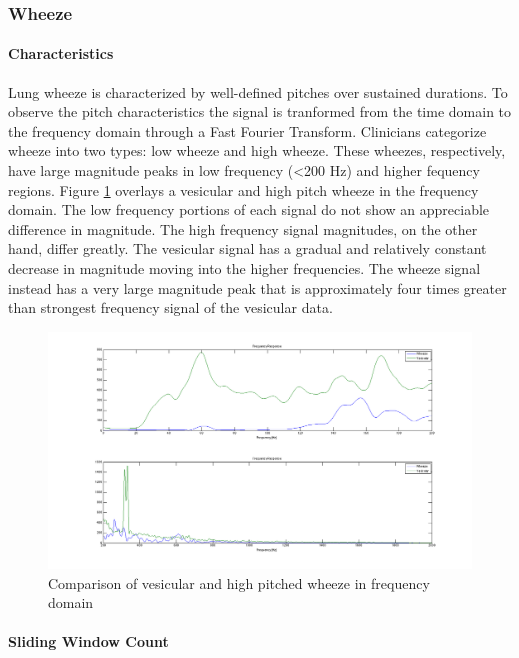 \documentclass{article}
\begin{document}
\subsubsection{Wheeze}

\paragraph{Characteristics}

Lung wheeze is characterized by well-defined pitches over sustained durations. To observe the pitch characteristics the signal is tranformed from the time domain to the frequency domain through a Fast Fourier Transform. Clinicians categorize wheeze into two types: low wheeze and high wheeze. These wheezes, respectively, have large magnitude peaks in low frequency (<200 Hz) and higher fequency regions. Figure \ref{fig:FFTVesicularWheeze} overlays a vesicular and high pitch wheeze in the frequency domain. The low frequency portions of each signal do not show an appreciable difference in magnitude. The high frequency signal magnitudes, on the other hand, differ greatly. The vesicular signal has a gradual and relatively constant decrease in magnitude moving into the higher frequencies. The wheeze signal instead has a very large magnitude peak that is approximately four times greater than strongest frequency signal of the vesicular data. \\

\begin{figure}[H]
	\includegraphics[width=\linewidth]{images/FFTVesicularWheeze.png}
	\caption{Comparison of vesicular and high pitched wheeze in frequency domain}
 	\label{fig:FFTVesicularWheeze}
\end{figure}

\paragraph{Sliding Window Count}
\end{document}

